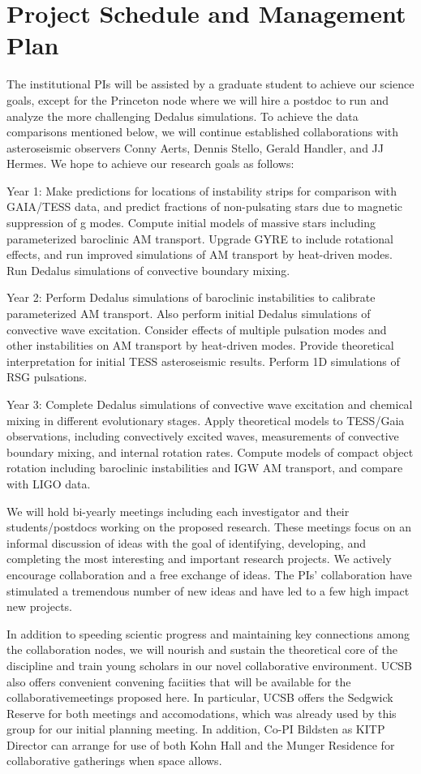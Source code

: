 \section{Project Schedule and Management Plan}

The institutional PIs will be assisted by a graduate student to achieve our science goals, except for the Princeton node where we will hire a postdoc to run and analyze the more challenging Dedalus simulations. To achieve the data comparisons mentioned below, we will continue established collaborations with asteroseismic observers Conny Aerts, Dennis Stello, Gerald Handler, and JJ Hermes. We hope to achieve our research goals as follows:

Year 1: Make predictions for locations of instability strips for comparison with GAIA/TESS data, and predict fractions of non-pulsating stars due to magnetic suppression of g modes. Compute initial models of massive stars including parameterized baroclinic AM transport. Upgrade GYRE to include rotational effects, and run improved simulations of AM transport by heat-driven modes. Run Dedalus simulations of convective boundary mixing.

Year 2: Perform Dedalus simulations of baroclinic instabilities to calibrate parameterized AM transport. Also perform initial Dedalus simulations of convective wave excitation. Consider effects of multiple pulsation modes and other instabilities on AM transport by heat-driven modes. Provide theoretical interpretation for initial TESS asteroseismic results. Perform 1D simulations of RSG pulsations.

Year 3: Complete Dedalus simulations of convective wave excitation and chemical mixing in different evolutionary stages. Apply theoretical models to TESS/Gaia observations, including convectively excited waves, measurements of convective boundary mixing, and internal rotation rates. Compute models of compact object rotation including baroclinic instabilities and IGW AM transport, and compare with LIGO data.

We will hold bi-yearly meetings including each investigator and their students/postdocs working on the proposed research. These meetings focus on an informal discussion of ideas with the goal of identifying, developing, and completing the most interesting and important research projects. We actively encourage collaboration and a free exchange of ideas. The PIs' collaboration have stimulated a tremendous number of new ideas and have led to a few high impact new projects.

In addition to speeding scientic progress and maintaining
key connections among the collaboration nodes, we will nourish and sustain the theoretical
core of the discipline and train young scholars in our novel collaborative environment. UCSB also offers convenient convening faciities that will be available for the collaborativemeetings proposed here. In particular, UCSB offers the Sedgwick Reserve for both meetings and accomodations, which was already used by this group for our initial planning meeting. In addition,
Co-PI Bildsten as KITP Director can arrange for use of both Kohn Hall and the Munger Residence for
collaborative gatherings when space allows.
